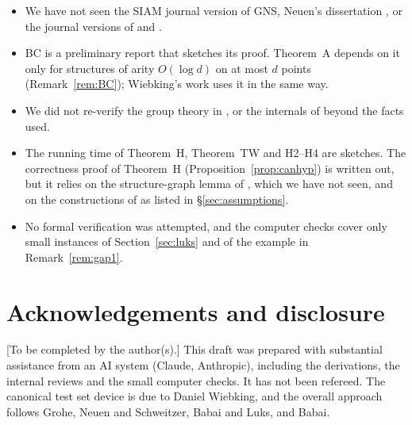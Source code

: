 \documentclass[11pt]{article}
\theoremstyle{plain}
\theoremstyle{definition}
\theoremstyle{remark}
\theoremstyle{named}
\theoremstyle{namedrm}
\begin{document}
\begin{itemize}
\item We have not seen the SIAM journal version of GNS, Neuen's dissertation \cite{Neu19}, or the journal
  versions of \cite{Neu20} and \cite{GNSW}.
\item BC is a preliminary report that sketches its proof. Theorem~A depends on it only for structures of
  arity $O(\log d)$ on at most $d$ points (Remark~\ref{rem:BC}); Wiebking's work uses it in the same way.
\item We did not re-verify the group theory in \cite[Thm.~3.13, Lemma~4.5]{GNS}, or the internals of
  \cite[Thms.~4.8, 4.9, 4.17]{Neu20} beyond the facts used.
\item The running time of Theorem~H, Theorem~TW and H2--H4 are sketches. The correctness proof of
  Theorem~H (Proposition~\ref{prop:canhyp}) is written out, but it relies on the structure-graph lemma of
  \cite{Neu19}, which we have not seen, and on the constructions of \cite{Neu20} as listed in
  \S\ref{sec:assumptions}.
\item No formal verification was attempted, and the computer checks cover only small instances of
  Section~\ref{sec:luks} and of the example in Remark~\ref{rem:gap1}.
\end{itemize}

\section*{Acknowledgements and disclosure}

[To be completed by the author(s).] This draft was prepared with substantial assistance from an AI system
(Claude, Anthropic), including the derivations, the internal reviews and the small computer checks. It has
not been refereed. The canonical test set device is due to Daniel Wiebking, and the overall approach follows
Grohe, Neuen and Schweitzer, Babai and Luks, and Babai.



\end{document}
